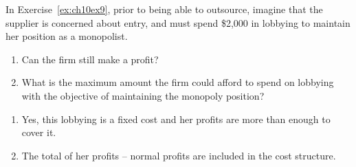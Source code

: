 \begin{enumialphparenastyle}
\begin{ex}\label{ex:ch10ex10}
In Exercise~\ref{ex:ch10ex9}, prior to being able to outsource, imagine that the supplier is concerned about entry, and must spend \$2,000 in lobbying to maintain her position as a monopolist.
\begin{enumerate}
	\item	Can the firm still make a profit?
	\item	What is the maximum amount the firm could afford to spend on lobbying with the objective of maintaining the monopoly position?
\end{enumerate}
\begin{sol}
\begin{enumerate}
	\item	Yes, this lobbying is a fixed cost and her profits are more than enough to cover it.
	\item	The total of her profits -- normal profits are included in the cost structure.
\end{enumerate}
\end{sol}
\end{ex}


\end{enumialphparenastyle}
